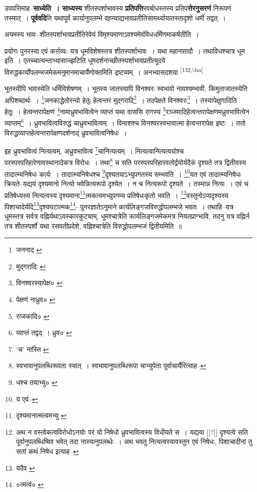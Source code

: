 \documentclass[article,12pt,a4paper]{memoir}
\begin{document}
	  \pstart उपपत्तिमाह--\textbf{साध्येति । साध्यस्य} शीतस्पर्शाभावस्य \textbf{प्रतिपत्ति}रवबोधस्तस्य प्रतिप\textbf{त्तेरनुसरणं} निरूपणं तस्मात् । \textbf{पूर्ववदि}ति यथापूर्वं कार्यानुपलम्भे वह्न्याद्यभावप्रतीतिसामर्थ्यायातस्तादृशो धर्मी तद्वत् ।
	\pend
      

	  \pstart अयमस्य भावः--शीतस्पर्शाभावप्रतीतिरेवेयं विमृश्यमाणाऽवश्यमेवंविधधर्मिणमाकर्षतीति ।
	\pend
      

	  \pstart प्रयोगः पुनरस्या एवं कर्त्तव्यः--यत्र धूमविशेषस्तत्र शीतस्पर्शाभावः । यथा महानसादौ । तथाविधश्चात्र धूम इति । एतच्चात्यन्ताभ्यासाज्झटिति धूमदर्शनाच्छीतस्पर्शाभावप्रतीत्युदये विरुद्धकार्योपलम्भजमेकमनुमानमाचार्येणोक्तमिति द्रष्टव्यम् । अनभ्यासदशया  \leavevmode\textsuperscript{\rmlatinfont\tiny [132/dm]} 
	  
	भूतस्यीपि भावस्येति धर्मिविशेषणम् । भूतस्य जातस्यापि विनश्वरः स्वभावो नावश्यम्भावी, किमुताजातस्येति अपिशब्दार्थः । \footnote{जननाद् \cite{dp-msA} \cite{dp-edP} \cite{dp-edH} \cite{dp-edE}}जनकाद्धेतोरन्यो हेतुः हेत्वन्तरं मुद्गरादि\footnote{मुद्गरादिः \cite{dp-msC}} । तदपेक्षते विनश्वरः\footnote{विनश्वरस्यापेक्ष० \cite{dp-msA}} । तस्यापेक्षुणादिति हेतुः । हेत्वन्तरापेक्षणं \footnote{पेक्षणं नाध्रुव० \cite{dp-msB}}नामाध्रुवभावित्वेन व्याप्तं यथा वाससि रागस्य \footnote{राजकादि० \cite{dp-msB} \cite{dp-msC} \cite{dp-msD}}रञ्जमादिहेत्वन्तरापेक्षणमध्रुवभावित्वेन व्याप्तम्\footnote{व्याप्तं तद्वद् । ध्रुव० \cite{dp-msC}} । ध्रुवभावित्वविरुद्धं चाध्रुवभावित्वम् । विनाशश्च विनश्वरस्वभावात्मा हेत्वन्तरापेक्ष इष्टः । ततो विरुद्धव्याप्तहेत्वन्तरापेक्षणदर्शनाद् ध्रुवभावित्वनिषेधः । 
	  
	इह ध्रुवभावित्वं नित्यत्वम्, अध्रुवभावित्वं \footnote{‘च’ नास्ति \cite{dp-msB} \cite{dp-msD}}चानित्यत्वम् । नित्यत्वानित्यत्वयोश्च परस्परपरिहारेणावस्थानादेकत्र विरोधः । तथा\footnote{स्वभावानुपलब्धिरूपता स्यात् । स्वभावानुपलब्धिरूपा चाभ्युपेता पूर्वाचार्यैरित्याह--\cite{dp-msD-n}} च सति परस्परपरिहारवतोर्द्वयोर्यदैकं दृश्यते तत्र द्वितीयस्य तादात्म्यनिषेधः कार्यः । तादात्म्यनिषेधश्च \footnote{धश्च तयाभ्यु० \cite{dp-msA}}दृश्यतयाऽभ्युपगतस्य सम्भवति । \footnote{य एवं--\cite{dp-msA}}यत एवं तादात्म्यनिषेधः क्रियते--यद्ययं दृश्यमानो नित्यो भवेन्नित्यरूपो दृश्येत । न च नित्यरूपो दृश्यते । तस्मान्न नित्यः । एवं च प्रतिषेध्यस्य नित्यत्वस्य दृश्यमाना\footnote{दृश्यमानात्मत्वमभ्यु \cite{dp-msA} \cite{dp-edP} \cite{dp-edH} \cite{dp-edE} \cite{dp-edN}}त्मकत्वमभ्युपगम्य प्रतिषेधःकृतो भवति । \footnote{अथ न वस्त्वेकत्वविरोधोऽनयोः परं यो निषेधो ध्रुवभावित्वस्य विधीयते स । यद्यया [[?]] दृश्यत्वे सति पूर्वानुपलब्धिष्विव भवेत् तदा नास्यानुपलब्धेः । अथ भवतु नित्यत्वस्यावस्तुन एवं निषेधः, पिशाचादीनां तु सतां कथं निषेध इत्याह--\cite{dp-msD-n}}वस्तुनोऽप्यदृश्यस्य पिशाचादेर्यदि\footnote{यदैव \cite{dp-msB}}दृश्यघटात्मक\footnote{०त्मत्वं० \cite{dp-msA} \cite{dp-edP} \cite{dp-edH} \cite{dp-edE} \cite{dp-edN}}- पुनरज्ञातेऽनुमाने कार्यलिङ्गजविरुद्धोपलम्भजे भवतः । तथाहि--यत्र धूमस्तत्र सर्वत्र वह्निर्यथाऽयस्कारकुट्याम्, धूमश्चात्रेति कार्यलिङ्गजमेकमत्र नियतप्राग्भावि, तदनु यत्र वह्निर्न तत्र शीतस्पर्शो यथा रसवतीप्रदेशे, वह्निश्चात्रेति विरुद्धोपलम्भजं द्वितीयमिति ॥
	\pend
      
\end{document}
